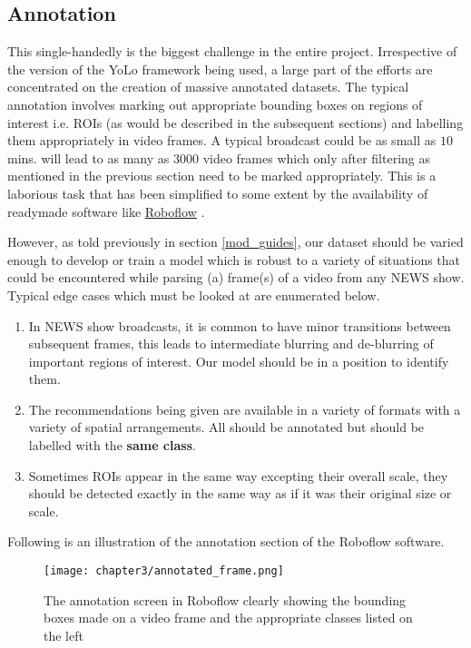 \subsection{Annotation}
This single-handedly is the biggest challenge in the entire project. Irrespective of the version of the YoLo framework being used, a large part of the efforts are concentrated on the creation of massive annotated datasets. The typical annotation involves marking out appropriate bounding boxes on regions of interest i.e. ROIs (as would be described in the subsequent sections) and labelling them appropriately in video frames. A typical broadcast could be as small as $10$ mins. will lead to as many as $3000$ video frames which only after filtering as mentioned in the previous section need to be marked appropriately. This is a laborious task that has been simplified to some extent by the availability of readymade software like \href{https://roboflow.com/annotate}{Roboflow} \cite{rb2022}. \par

However, as told previously in section \ref{mod_guides}, our dataset should be varied enough to develop or train a model which is robust to a variety of situations that could be encountered while parsing (a) frame(s) of a video from any NEWS show. Typical edge cases which must be looked at are enumerated below.
\begin{enumerate}
 \item In NEWS show broadcasts, it is common to have minor transitions between subsequent frames, this leads to intermediate blurring and de-blurring of important regions of interest. Our model should be in a position to identify them.
 \item The recommendations being given are available in a variety of formats with a variety of spatial arrangements. All should be annotated but should be labelled with the \textbf{same class}.
 \item Sometimes ROIs appear in the same way excepting their overall scale, they should be detected exactly in the same way as if it was their original size or scale.
\end{enumerate}
Following is an illustration of the annotation section of the Roboflow software.

\begin{figure}[h]
  \centering
  \texttt{[image: chapter3/annotated\_frame.png]}
  \caption{The annotation screen in Roboflow clearly showing the bounding boxes made on a video frame and the appropriate classes listed on the left}
  \label{fig:annot_frame}
\end{figure}

